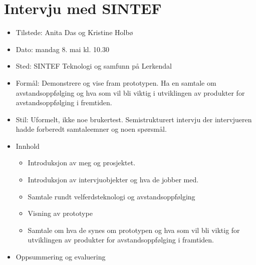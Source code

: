 
\section{Intervju med SINTEF}\label{intervju-med-sintef}

\begin{itemize}
\tightlist
\item
  Tilstede: Anita Das og Kristine Holbø
\item
  Dato: mandag 8. mai kl. 10.30
\item
  Sted: SINTEF Teknologi og samfunn på Lerkendal
\item
  Formål: Demonstrere og vise fram prototypen. Ha en samtale om
  avstandsoppfølging og hva som vil bli viktig i utviklingen av
  produkter for avstandsoppfølging i fremtiden.
\item
  Stil: Uformelt, ikke noe brukertest. Semistrukturert intervju der
  intervjueren hadde forberedt samtaleemner og noen spørsmål.
\item
  Innhold

  \begin{itemize}
  \tightlist
  \item
    Introduksjon av meg og prosjektet.
  \item
    Introduksjon av intervjuobjekter og hva de jobber med.
  \item
    Samtale rundt velferdsteknologi og avstandsoppfølging
  \item
    Visning av prototype
  \item
    Samtale om hva de synes om prototypen og hva som vil bli viktig for
    utviklingen av produkter for avstandsoppfølging i framtiden.
  \end{itemize}
\item
  Oppsummering og evaluering


\end{itemize}
